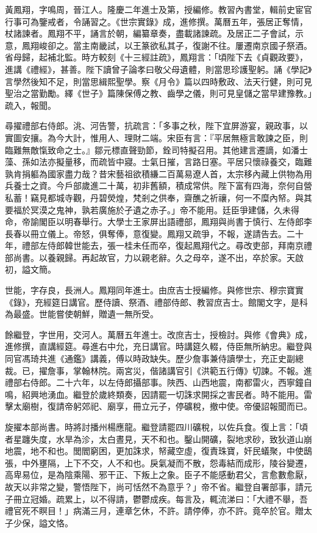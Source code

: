 \begin{pinyinscope}
{黃鳳翔，字鳴周，晉江人。隆慶二年進士及第，授編修。教習內書堂，輯前史宦官行事可為鑒戒者，令誦習之。《世宗實錄》成，進修撰。萬曆五年，張居正奪情，杖諸諫者。鳳翔不平，誦言於朝，編纂章奏，盡載諸諫疏。及居正二子會試，示意，鳳翔峻卻之。當主南畿試，以王篆欲私其子，復謝不往。屢遷南京國子祭酒。省母歸，起補北監。時方較刻《十三經註疏》，鳳翔言：「頃陛下去《貞觀政要》，進講《禮經》，甚善。陛下讀曾子論孝曰敬父母遺體，則當思珍護聖躬。誦《學記》言學然後知不足，則當思緝熙聖學。察《月令》篇以四時敷政、法天行健，則可見聖治之當勤勵。繹《世子》篇陳保傅之教、齒學之儀，則可見皇儲之當早建豫教。」疏入，報聞。

尋擢禮部右侍郎。洮、河告警，抗疏言：「多事之秋，陛下宜屏游宴，親政事，以實圖安攘。為今大計，惟用人、理財二端。宋臣有言：『平居無極言敢諫之臣，則臨難無敵愾致命之士。』鄒元標直聲勁節，銓司特擬召用。其他建言遷謫，如潘士藻、孫如法亦擬量移，而疏皆中寢。士氣日摧，言路日塞。平居只懷祿養交，臨難孰肯捐軀為國家盡力哉？昔宋藝祖欲積縑二百萬易遼人首，太宗移內藏上供物為用兵養士之資。今戶部歲進二十萬，初非舊額，積成常供。陛下富有四海，奈何自營私蓄！竊見都城寺觀，丹碧熒煌，梵剎之供奉，齋醮之祈禳，何一不糜內帑。與其要福於冥漠之鬼神，孰若廣施於孑遺之赤子。」帝不能用。廷臣爭建儲，久未得命，帝諭閣臣以明春舉行。大學士王家屏出語禮部，鳳翔與尚書于慎行、左侍郎李長春以冊立儀上。帝怒，俱奪俸，意復變。鳳翔又疏爭，不報，遂請告去。二十年，禮部左侍郎韓世能去，張一桂未任而卒，復起鳳翔代之。尋改吏部，拜南京禮部尚書。以養親歸。再起故官，力以親老辭。久之母卒，遂不出，卒於家。天啟初，謚文簡。

世能，字存良，長洲人。鳳翔同年進士。由庶吉士授編修。與修世宗、穆宗寶實《錄》，充經筵日講官。歷侍讀、祭酒、禮部侍郎、教習庶吉士。館閣文字，是科為最盛。世能嘗使朝鮮，贈遺一無所受。

餘繼登，字世用，交河人。萬曆五年進士。改庶吉士，授檢討。與修《會典》成，進修撰，直講經筵。尋進右中允，充日講官。時講筵久輟，侍臣無所納忠。繼登與同官馮琦共進《通鑑》講義，傅以時政缺失。歷少詹事兼侍讀學士，充正史副總裁。已，擢詹事，掌翰林院。兩宮災，偕諸講官引《洪範五行傳》切諫。不報。進禮部右侍郎。二十六年，以左侍郎攝部事。陜西、山西地震，南都雷火，西寧鐘自鳴，紹興地湧血。繼登於歲終類奏，因請罷一切誅求開採之害民者。時不能用。雷擊太廟樹，復請帝躬郊祀、廟享，冊立元子，停礦稅，撤中使。帝優詔報聞而已。

旋擢本部尚書。時將討播州楊應龍。繼登請罷四川礦稅，以佐兵食。復上言：「頃者星躔失度，水旱為沴，太白晝見，天不和也。鑿山開礦，裂地求砂，致狄道山崩地震，地不和也。閭閻窮困，更加誅求，帑藏空虛，復責珠寶，奸民蟻聚，中使鴟張，中外壅隔，上下不交，人不和也。戾氣凝而不散，怨毒結而成形，陵谷變遷，高卑易位，是為陰乘陽、邪干正、下叛上之象。臣子不能感動君父，言愈數愈厭，故天以非常之變，警悟陛下，尚可恬然不為意乎？」帝不省。繼登自署部事，請元子冊立冠婚。疏累上，以不得請，鬱鬱成疾。每言及，輒流涕曰：「大禮不舉，吾禮官死不瞑目！」病滿三月，連章乞休，不許。請停俸，亦不許。竟卒於官。贈太子少保，謚文恪。

}
\end{pinyinscope}
